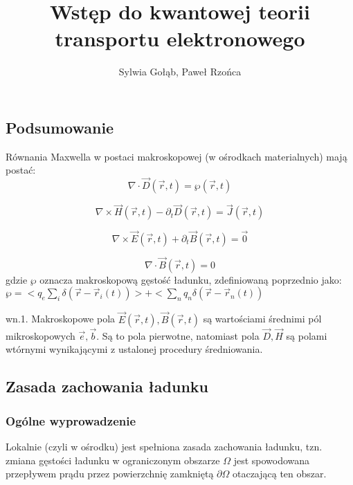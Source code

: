 \documentclass[11pt]{article}
\title{Wstęp do kwantowej teorii transportu elektronowego}
\author{Sylwia Gołąb, Paweł Rzońca}
\renewcommand{\r}{\vec{r}}
\newcommand{\B}{\vec{B}(\vec{r},t)}
\newcommand{\E}{\vec{E}(\vec{r},t)}
\renewcommand{\arg}{(\vec{r},t)}
\begin{document}
\maketitle

\tableofcontents
\newpage







\subsection{Podsumowanie}
Równania Maxwella w postaci makroskopowej (w ośrodkach materialnych) mają postać:
\begin{equation} \nabla \cdot \vec{D}\arg=\wp\arg \label{r1}
 \end{equation}
  
  \begin{equation} \nabla \times \vec{H}\arg-\partial_t\vec{D}\arg=\vec{J}\arg \label{r2}
  \end{equation}

  \begin{equation} \nabla \times \E+\partial_t \B=\vec{0} \label{r3}\end{equation} 

  \begin{equation} \nabla \cdot \B=0 \end{equation}
  gdzie $\wp$ oznacza makroskopową gęstość ładunku, zdefiniowaną poprzednio jako: $\wp=<q_e\sum_i\delta(\r-\r_i(t))>+<\sum_nq_n\delta(\r-\r_n(t))$

  wn.1. Makroskopowe pola $\E,\B$ są wartościami średnimi pól mikroskopowych $\vec{e},\vec{b}$. Są to pola pierwotne, natomiast pola $\vec{D},\vec{H}$ są polami wtórnymi wynikającymi z ustalonej procedury średniowania.

  \subsection{Zasada zachowania ładunku}
  \subsubsection{Ogólne wyprowadzenie}
  Lokalnie (czyli w ośrodku) jest spełniona zasada zachowania ładunku, tzn. zmiana gęstości ładunku w ograniczonym obszarze $\Omega$ jest spowodowana przepływem prądu przez powierzchnię zamkniętą $\partial\Omega$ otaczającą ten obszar.
\end{document}
